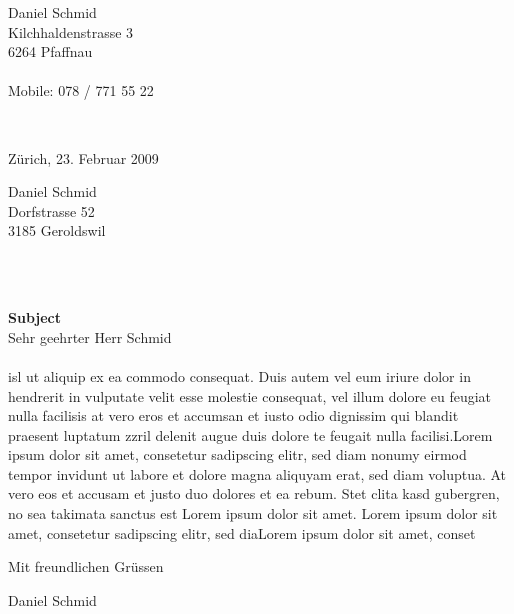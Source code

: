 \documentclass[a4paper,12pt]{letter}
\begin{document}
\thispagestyle{fancy}
\renewcommand{\headrulewidth}{0pt}
\parbox[t][20mm]{50mm}{Daniel Schmid \\ Kilchhaldenstrasse 3 \\ 6264 Pfaffnau \\\\ Mobile: 078 / 771 55 22} \\
\par\vspace{10mm}
\parbox[b][15mm]{90mm}{Zürich, 23. Februar 2009}
\parbox[b][15mm]{55mm} {Daniel Schmid \\ Dorfstrasse 52 \\ 3185 Geroldswil} \\\\

\par 
\textbf{Subject} \\

Sehr geehrter Herr Schmid \\\\
isl ut aliquip ex ea commodo consequat. Duis autem vel eum iriure dolor in hendrerit in vulputate velit esse molestie consequat, vel illum dolore eu feugiat nulla facilisis at vero eros et accumsan et iusto odio dignissim qui blandit praesent luptatum zzril delenit augue duis dolore te feugait nulla facilisi.Lorem ipsum dolor sit amet, consetetur sadipscing elitr, sed diam nonumy eirmod tempor invidunt ut labore et dolore magna aliquyam erat, sed diam voluptua. At vero eos et accusam et justo duo dolores et ea rebum. Stet clita kasd gubergren, no sea takimata sanctus est Lorem ipsum dolor sit amet. Lorem ipsum dolor sit amet, consetetur sadipscing elitr, sed diaLorem ipsum dolor sit amet, conset
\vspace{10mm}
\par\hspace{90mm}Mit freundlichen Grüssen
\par\vspace{15mm}\hspace{90mm}Daniel Schmid
\end{document}
